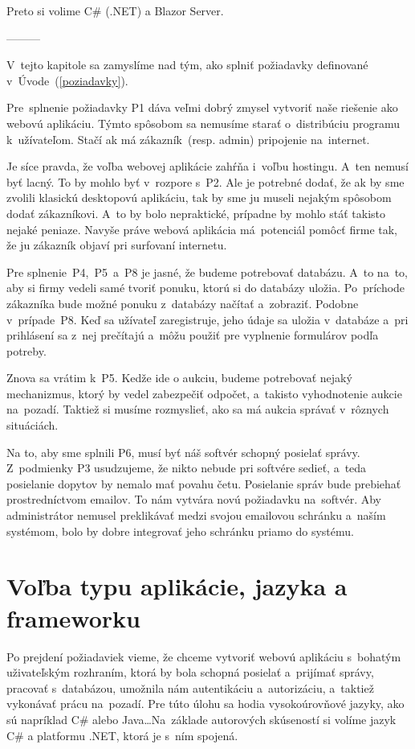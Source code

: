 Preto si volime C\# (.NET) a Blazor Server.


---------



V~tejto kapitole sa zamyslíme nad tým, ako splniť požiadavky definované v~Úvode~(\ref{poziadavky}).

Pre~splnenie požiadavky P1 dáva veľmi dobrý zmysel vytvoriť naše riešenie ako webovú aplikáciu. Týmto spôsobom sa nemusíme starať o~distribúciu programu k~užívateľom. Stačí ak má zákazník~(resp. admin) pripojenie na~internet.

Je síce pravda, že voľba webovej aplikácie zahŕňa i~voľbu hostingu. A~ten nemusí byť lacný. To by mohlo byť v~rozpore s~P2. Ale je potrebné dodať, že ak by sme zvolili klasickú desktopovú aplikáciu, tak by sme ju museli nejakým spôsobom dodať zákazníkovi. A~to by bolo nepraktické, prípadne by mohlo stáť takisto nejaké peniaze. Navyše práve webová aplikácia má~potenciál pomôcť firme tak, že ju zákazník objaví pri surfovaní internetu.

Pre splnenie~P4,~P5~a~P8 je jasné, že budeme potrebovať databázu. A~to na~to, aby si firmy vedeli samé tvoriť ponuku, ktorú si do databázy uložia. Po~príchode zákazníka bude možné ponuku z~databázy načítať a~zobraziť. Podobne v~prípade~P8. Keď sa užívateľ zaregistruje, jeho údaje sa uložia v~databáze a~pri prihlásení sa z~nej prečítajú a~môžu použiť pre vyplnenie formulárov podľa potreby.

Znova sa vrátim k~P5. Kedže ide o aukciu, budeme potrebovať nejaký mechanizmus, ktorý by vedel zabezpečiť odpočet, a~takisto vyhodnotenie aukcie na~pozadí. Taktiež si musíme rozmyslieť, ako sa má aukcia správať v~rôznych situáciách.

Na to, aby sme splnili P6, musí byť náš softvér schopný posielať správy. Z~podmienky P3 usudzujeme, že nikto nebude pri softvére sedieť, a~teda posielanie dopytov by nemalo mať povahu četu. Posielanie správ bude prebiehať prostredníctvom emailov. To nám vytvára novú požiadavku na~softvér. Aby administrátor nemusel preklikávať medzi svojou emailovou schránku a~naším systémom, bolo by dobre integrovať jeho schránku priamo do systému.

\section{Voľba typu aplikácie, jazyka a frameworku}

Po prejdení požiadaviek vieme, že chceme vytvoriť webovú aplikáciu s~bohatým uživateľským rozhraním, ktorá by bola schopná posielať a~prijímať správy, pracovať s~databázou, umožnila nám autentikáciu a~autorizáciu, a~taktiež vykonávať prácu na~pozadí. Pre túto úlohu sa hodia vysokoúrovňové jazyky, ako sú napríklad C\# alebo Java\dots Na~základe autorových skúseností si volíme jazyk C\# a platformu .NET, ktorá je s~ním spojená.

